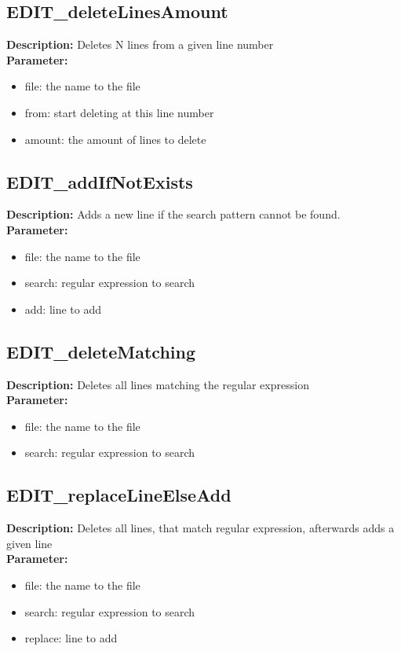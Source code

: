 \subsection{EDIT\_deleteLinesAmount}
\textbf{Description:} Deletes N lines from a given line number\\
\textbf{Parameter:}
\begin{itemize}
\item file: the name to the file
\item from: start deleting at this line number
\item amount: the amount of lines to delete
\end{itemize}

\subsection{EDIT\_addIfNotExists}
\textbf{Description:} Adds a new line if the search pattern cannot be found.\\
\textbf{Parameter:}
\begin{itemize}
\item file: the name to the file
\item search: regular expression to search
\item add: line to add
\end{itemize}

\subsection{EDIT\_deleteMatching}
\textbf{Description:} Deletes all lines matching the regular expression\\
\textbf{Parameter:}
\begin{itemize}
\item file: the name to the file
\item search: regular expression to search
\end{itemize}

\subsection{EDIT\_replaceLineElseAdd}
\textbf{Description:} Deletes all lines, that match regular expression, afterwards adds a given line\\
\textbf{Parameter:}
\begin{itemize}
\item file: the name to the file
\item search: regular expression to search
\item replace: line to add
\end{itemize}


